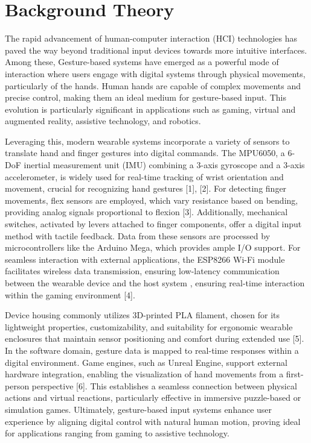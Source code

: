 \section{Background Theory}
The rapid advancement of human-computer interaction (HCI) technologies has paved the way beyond traditional input devices towards more intuitive interfaces. Among these, Gesture-based systems have emerged as a powerful mode of interaction where users engage with digital systems through physical movements, particularly of the hands. Human hands are capable of complex movements and precise control, making them an ideal medium for gesture-based input. This evolution is particularly significant in applications such as gaming, virtual and augmented reality, assistive technology, and robotics.

Leveraging this, modern wearable systems incorporate a variety of sensors to translate hand and finger gestures into digital commands. The MPU6050, a 6-DoF inertial measurement unit (IMU) combining a 3-axis gyroscope and a 3-axis accelerometer, is widely used for real-time tracking of wrist orientation and movement, crucial for recognizing hand gestures [1], [2]. For detecting finger movements, flex sensors are employed, which vary resistance based on bending, providing analog signals proportional to flexion [3]. Additionally, mechanical switches, activated by levers attached to finger components, offer a digital input method with tactile feedback. Data from these sensors are processed by microcontrollers like the Arduino Mega, which provides ample I/O support. For seamless interaction with external applications, the ESP8266 Wi-Fi module facilitates wireless data transmission, ensuring low-latency communication between the wearable device and the host system , ensuring real-time interaction within the gaming environment [4].

Device housing commonly utilizes 3D-printed PLA filament, chosen for its lightweight properties, customizability, and suitability for ergonomic wearable enclosures that maintain sensor positioning and comfort during extended use [5]. In the software domain, gesture data is mapped to real-time responses within a digital environment. Game engines, such as Unreal Engine, support external hardware integration, enabling the visualization of hand movements from a first-person perspective [6]. This establishes a seamless connection between physical actions and virtual reactions, particularly effective in immersive puzzle-based or simulation games. Ultimately, gesture-based input systems enhance user experience by aligning digital control with natural human motion, proving ideal for applications ranging from gaming to assistive technology.

